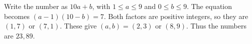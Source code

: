 Write the number as $10a+b$, with $1\le a\le9$ and $0\le b\le9$. The equation becomes $(a-1)(10-b)=7$. Both factors are positive integers, so they are $(1,7)$ or $(7,1)$. These give $(a,b)=(2,3)$ or $(8,9)$. Thus the numbers are $\boxed{23,89}$.

